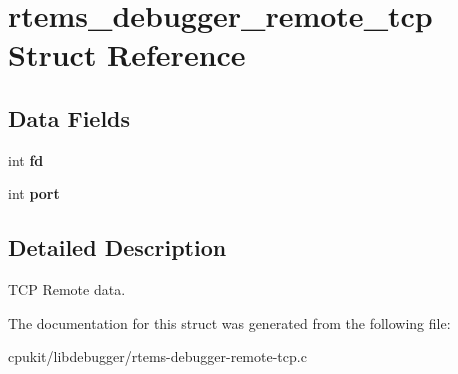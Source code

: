 \hypertarget{structrtems__debugger__remote__tcp}{}\section{rtems\+\_\+debugger\+\_\+remote\+\_\+tcp Struct Reference}
\label{structrtems__debugger__remote__tcp}
\subsection*{Data Fields}
\begin{DoxyCompactItemize}
\item 
\mbox{\label{structrtems__debugger__remote__tcp_af7edf9033a3ce3dc9c57b5d6e7575eca}} 
int {\bfseries fd}
\item 
\mbox{\label{structrtems__debugger__remote__tcp_aa706d7d8caf073c055660a61992528f0}} 
int {\bfseries port}
\end{DoxyCompactItemize}


\subsection{Detailed Description}
T\+CP Remote data. 

The documentation for this struct was generated from the following file\+:\begin{DoxyCompactItemize}
\item 
cpukit/libdebugger/rtems-\/debugger-\/remote-\/tcp.\+c\end{DoxyCompactItemize}
